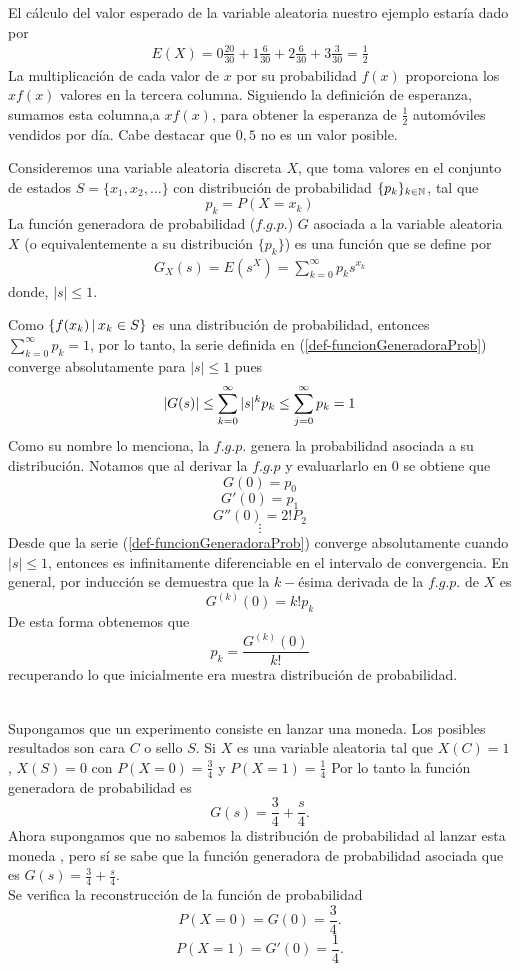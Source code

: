 \begin{Ejm}
    El cálculo del valor esperado de la variable aleatoria nuestro ejemplo estaría dado por
    \begin{eqnarray}
       E(X)= 0\frac{20}{30}+1\frac{6}{30}+2\frac{6}{30}+3\frac{3}{30}=\frac{1}{2}
    \end{eqnarray}
    La multiplicación de cada valor de $x$ por su probabilidad $f(x)$ proporciona los $xf(x)$ valores en la tercera columna. Siguiendo la definición de esperanza, sumamos esta columna,a $x f(x)$, para obtener la esperanza de $\frac{1}{2}$ automóviles vendidos por día. Cabe destacar que $0,5$ no es un valor posible.
\end{Ejm}
\begin{Def}
    \label{def-prob-funcionGeneraProb}
    Consideremos una variable aleatoria discreta $X$, que toma valores en el conjunto de estados $S=\{x_1,x_2,\ldots\}$ con distribución de probabilidad $\{p_k\}_{k\in{\mathbb{N}}}$, tal que $$p_k=P(X=x_k)$$ 
    La función generadora de probabilidad ($f.g.p.$) $G$ asociada a la variable aleatoria $X$ (o equivalentemente a su distribución $\{p_k\}$) es una función que se define por 
    \begin{eqnarray}
        G_X(s)=E(s^X)=\sum_{k=0}^\infty p_k s^{x_k} \label{def-funcionGeneradoraProb}
    \end{eqnarray} 
    donde,  $|s|\leq 1$.
\end{Def}
Como $\{f(x_k)\thinspace|\thinspace x_k\in S\}$ es una distribución de probabilidad, entonces\\ $\sum_{k=0}^\infty p_k=1$, por lo tanto, la serie definida en (\ref{def-funcionGeneradoraProb}) converge absolutamente para $|s|\leq 1$ pues $$|G(s)|\leq \sum_{k=0}^\infty|s|^k p_k\leq\sum_{j=0}^{\infty} p_k=1 $$ 
Como su nombre lo menciona, la $f.g.p.$ genera la probabilidad asociada a su distribución.
Notamos que al derivar la $f.g.p$ y evaluarlarlo en $0$ se obtiene que
$$G(0)=p_0$$ $$G'(0)=p_1$$ $$G''(0)=2!P_2$$ $$\vdots$$Desde que la serie (\ref{def-funcionGeneradoraProb}) converge absolutamente cuando $|s|\leq 1$, entonces es infinitamente diferenciable en el intervalo de convergencia. En general, por inducción se demuestra que la $k-$ésima derivada de la $f.g.p.$ de $X$ es $$G^{(k)}(0)=k!p_k$$
De esta forma obtenemos que $$p_k=\frac{G^{(k)}(0)}{k!}$$ recuperando lo que inicialmente era nuestra distribución de probabilidad.\\\\
\begin{Ejm}
    Supongamos que un experimento consiste en lanzar una moneda. Los posibles resultados son cara $C$ o sello $S$. Si $X$ es una variable aleatoria tal que $X(C)=1$, $X(S)=0$ con $P(X=0)=\frac{3}{4}$ y $P(X=1)=\frac{1}{4}$
    Por lo tanto la función generadora de probabilidad es
    $$G(s)=\frac{3}{4}+\frac{s}{4}.$$
    Ahora supongamos que no sabemos la distribución de probabilidad al lanzar esta moneda , pero sí se sabe que la función generadora de probabilidad asociada que es $G(s)=\frac{3}{4}+\frac{s}{4}.$\\
    Se verifica la reconstrucción de la función de probabilidad
    $$P(X=0)=G(0)=\frac{3}{4}.$$    $$P(X=1)=G'(0)=\frac{1}{4}.$$
\end{Ejm}
